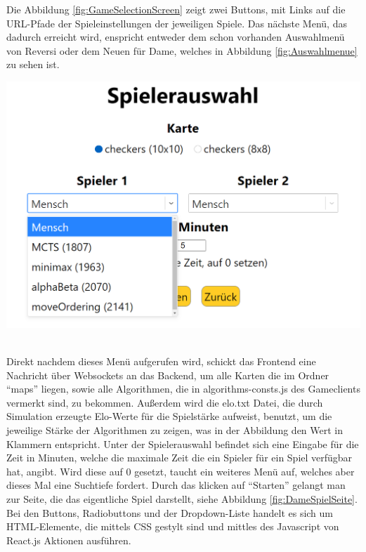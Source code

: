 \documentclass[12pt,a4paper,bibliography=totocnumbered,listof=totocnumbered]{article}
\begin{document}
Die Abbildung \ref{fig:GameSelectionScreen} zeigt zwei Buttons, mit Links auf die \ac{URL}-Pfade der Spieleinstellungen der jeweiligen Spiele. 
Das nächste Menü, das dadurch erreicht wird,
enspricht entweder dem schon vorhanden Auswahlmenü von Reversi oder dem Neuen für Dame, welches in Abbildung \ref{fig:Auswahlmenue} zu sehen ist.

\vspace{1em}
\begin{minipage}{\linewidth}
	\centering
	\includegraphics[width=0.7\linewidth]{pics/AlgorithmeninderApplikation.png}
	\label{fig:Auswahlmenue}
\end{minipage}
\\

Direkt nachdem dieses Menü aufgerufen wird, schickt das Frontend eine Nachricht über Websockets an das Backend, um alle Karten die im Ordner ``maps'' liegen, sowie 
alle Algorithmen, die in algorithms-consts.js des Gameclients vermerkt sind, zu bekommen. Außerdem wird die elo.txt Datei, die durch 
Simulation erzeugte Elo-Werte für die Spielstärke aufweist, benutzt, um die jeweilige Stärke der Algorithmen zu zeigen, was in der Abbildung 
den Wert in Klammern entspricht. Unter der Spielerauswahl befindet sich eine Eingabe für die Zeit in Minuten, welche die maximale Zeit 
die ein Spieler für ein Spiel verfügbar hat, angibt. Wird diese auf 0 gesetzt, taucht ein weiteres Menü auf, welches aber dieses Mal eine 
Suchtiefe fordert. Durch das klicken auf ``Starten'' gelangt man zur Seite, die das eigentliche Spiel darstellt, siehe Abbildung \ref{fig:DameSpielSeite}.
Bei den Buttons, Radiobuttons und der Dropdown-Liste handelt es sich um HTML-Elemente, die mittels CSS gestylt sind und mittles 
des Javascript von React.js Aktionen ausführen.
\end{document}
